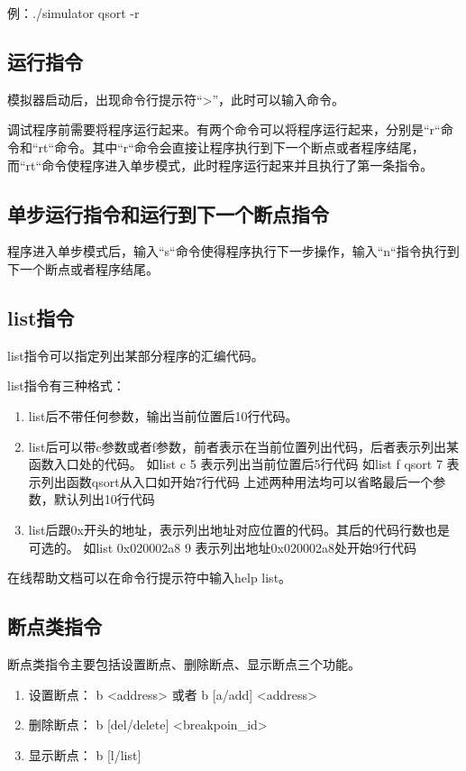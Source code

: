\documentclass[12pt,a4paper]{article}
\begin{document}
例：./simulator qsort -r

\subsection{运行指令}
模拟器启动后，出现命令行提示符“>”，此时可以输入命令。

调试程序前需要将程序运行起来。有两个命令可以将程序运行起来，分别是“r“命令和“rt“命令。其中“r“命令会直接让程序执行到下一个断点或者程序结尾，而“rt“命令使程序进入单步模式，此时程序运行起来并且执行了第一条指令。

\subsection{单步运行指令和运行到下一个断点指令}
程序进入单步模式后，输入“s“命令使得程序执行下一步操作，输入“n“指令执行到下一个断点或者程序结尾。

\subsection{list指令}
list指令可以指定列出某部分程序的汇编代码。

list指令有三种格式：
\begin{enumerate}
\item list后不带任何参数，输出当前位置后10行代码。
\item list后可以带c参数或者f参数，前者表示在当前位置列出代码，后者表示列出某函数入口处的代码。
	\subitem 如list c 5 表示列出当前位置后5行代码
	\subitem 如list f qsort 7 表示列出函数qsort从入口如开始7行代码
	\subitem 上述两种用法均可以省略最后一个参数，默认列出10行代码
\item list后跟0x开头的地址，表示列出地址对应位置的代码。其后的代码行数也是可选的。
	\subitem 如list 0x020002a8 9 表示列出地址0x020002a8处开始9行代码
\end{enumerate}

在线帮助文档可以在命令行提示符中输入help list。

\subsection{断点类指令}
断点类指令主要包括设置断点、删除断点、显示断点三个功能。

\begin{enumerate}
\item 设置断点： b <address> 或者 b [a/add] <address>
\item 删除断点： b [del/delete] <breakpoin\_id>
\item 显示断点： b [l/list]
\end{enumerate}
\end{document}
